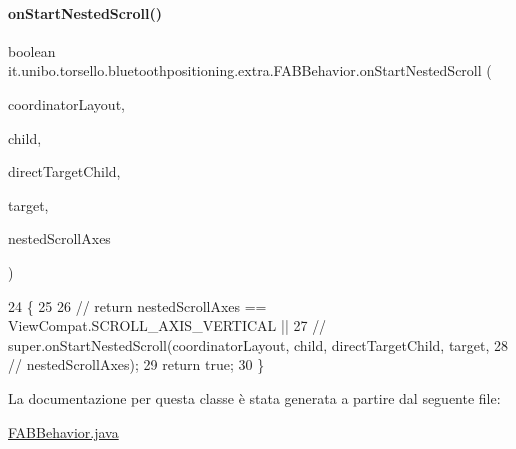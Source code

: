 \paragraph{\texorpdfstring{on\+Start\+Nested\+Scroll()}{onStartNestedScroll()}}
{\footnotesize\ttfamily boolean it.\+unibo.\+torsello.\+bluetoothpositioning.\+extra.\+F\+A\+B\+Behavior.\+on\+Start\+Nested\+Scroll (\begin{DoxyParamCaption}\item[{Coordinator\+Layout}]{coordinator\+Layout,  }\item[{final Floating\+Action\+Button}]{child,  }\item[{View}]{direct\+Target\+Child,  }\item[{View}]{target,  }\item[{int}]{nested\+Scroll\+Axes }\end{DoxyParamCaption})}


\begin{DoxyCode}
24                                                                                                   \{
25 
26 \textcolor{comment}{//        return nestedScrollAxes == ViewCompat.SCROLL\_AXIS\_VERTICAL ||}
27 \textcolor{comment}{//                super.onStartNestedScroll(coordinatorLayout, child, directTargetChild, target,}
28 \textcolor{comment}{//                        nestedScrollAxes);}
29         \textcolor{keywordflow}{return} \textcolor{keyword}{true};
30     \}
\end{DoxyCode}


La documentazione per questa classe è stata generata a partire dal seguente file\+:\begin{DoxyCompactItemize}
\item 
\hyperlink{FABBehavior_8java}{F\+A\+B\+Behavior.\+java}\end{DoxyCompactItemize}
